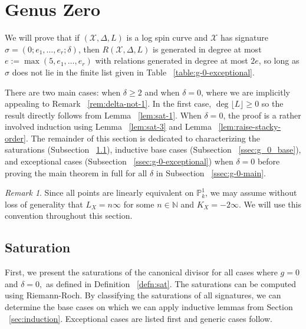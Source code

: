 \documentclass{amsart}
\theoremstyle{plain}
\theoremstyle{definition}
\theoremstyle{remark}
\newtheorem{rem}[thm]{Remark}
\numberwithin{equation}{section}
\newcommand\ssec{\subsection}
\newcommand\BN{{\mathbb N}}
\newcommand\BP{{\mathbb P}}
\newcommand \sx{\mathscr X}
\newcommand \halfcan{L}
\begin{document}

\section{Genus Zero}
\label{sec:g_0}
We will prove that if $(\sx , \Delta, \halfcan)$ is a log spin curve and
$\sx$ has signature $\sigma = (0; e_1, \ldots , e_r; \delta)$,
then $R(\sx , \Delta, L)$ is generated in degree at most $e := \max(
5, e_1, \ldots, e_r)$ with relations generated in degree at most $2e
$, so long as $\sigma$ does not lie in the finite list given in Table ~\ref{table:g-0-exceptional}.

There are two main cases: when $\delta \geq 2$ and when $\delta = 0$, where we are implicitly appealing to Remark ~\ref{rem:delta-not-1}. In the first case, $\deg \lfloor \halfcan \rfloor
\geq 0$ so the result directly follows from Lemma
~\ref{lem:sat-1}. When $\delta = 0$, the proof is a rather involved induction using Lemma
~\ref{lem:sat-3} and Lemma ~\ref{lem:raise-stacky-order}.
The remainder of this section is dedicated to characterizing the
saturations (Subsection ~\ref{ssec:g_0_saturation}), inductive
base cases (Subsection ~\ref{ssec:g_0_base}), and exceptional
cases (Subsection ~\ref{ssec:g-0-exceptional}) when $\delta = 0$
before proving the main theorem in full for all $\delta$ in
Subsection ~\ref{ssec:g-0-main}.

\begin{rem}
Since all points are linearly equivalent on $\BP^1_k$, we may assume without loss of generality that $L_X = n \infty$ for some $n \in \BN$ and $K_X = -2 \infty.$ We will use this convention throughout this section.
\end{rem}



\ssec{Saturation}
\label{ssec:g_0_saturation}
First, we present the saturations of the canonical divisor for
all cases where $g = 0$ and $\delta = 0,$ as defined in Definition
~\ref{defn:sat}. The saturations can be computed using Riemann-Roch.
By classifying the saturations of all signatures, we can determine
the base cases on which we can apply inductive lemmas from
Section ~\ref{sec:induction}. Exceptional cases are listed first
and generic cases follow.
\end{document}
